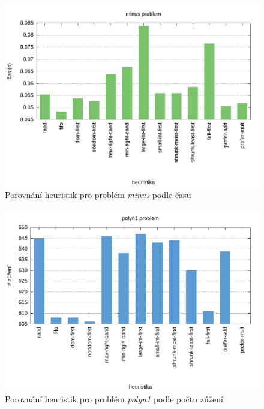 {\begin{figure}[H]
\centering
\includegraphics[scale=0.68]{chart/minus_time.pdf}
\caption{Porovnání heuristik pro problém \emph{minus} podle času}
\end{figure}

\begin{figure}[H]
\centering
\includegraphics[scale=0.68]{chart/polyn1_nar.pdf}
\caption{Porovnání heuristik pro problém \emph{polyn1} podle počtu zúžení}
\end{figure}

}
